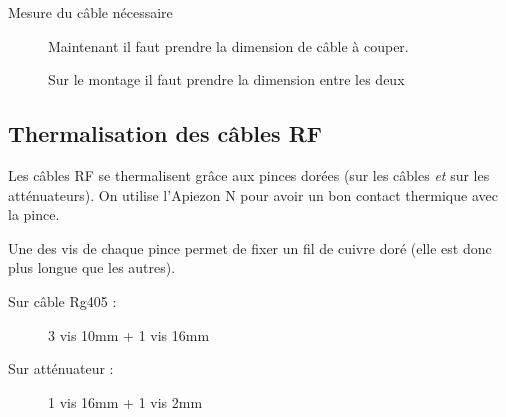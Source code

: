 \begin{description}
     \item[Mesure du câble nécessaire] Maintenant il faut prendre la dimension de câble à couper.
     
     Sur le montage il faut prendre la dimension entre les deux 
     
\end{description}

\subsection{Thermalisation des câbles RF}

Les câbles RF se thermalisent grâce aux pinces dorées (sur les câbles \textit{et} sur les atténuateurs). On utilise l'Apiezon N pour avoir un bon contact thermique avec la pince.

Une des vis de chaque pince permet de fixer un fil de cuivre doré (elle est donc plus longue que les autres).

\begin{description}
    \item[Sur câble Rg405 :] 3 vis 10mm + 1 vis 16mm
    \item[Sur atténuateur :] 1 vis 16mm + 1 vis 2mm
\end{description}
